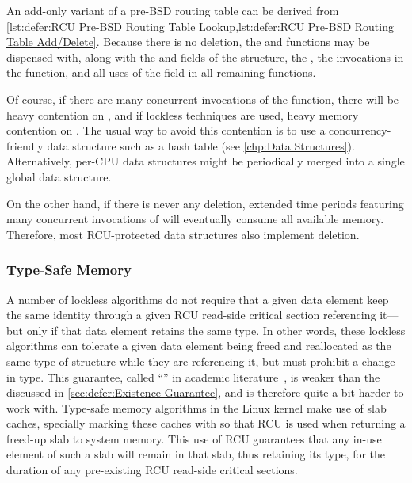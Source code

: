 An add-only variant of a pre-BSD routing table can be derived from
\cref{lst:defer:RCU Pre-BSD Routing Table Lookup,lst:defer:RCU Pre-BSD Routing Table Add/Delete}.
Because there is no deletion, the  and 
functions may be dispensed with, along with the 
and  fields of the  structure, the
, the  invocations in the
 function, and all uses of the  field
in all remaining functions.

Of course, if there are many concurrent invocations of the 
function, there will be heavy contention on , and if lockless
techniques are used, heavy memory contention on .
The usual way to avoid this contention is to use a concurrency-friendly
data structure such as a hash table (see \cref{chp:Data Structures}).
Alternatively, per-CPU data structures might be periodically merged
into a single global data structure.

On the other hand, if there is never any deletion, extended time periods
featuring many concurrent invocations of  will eventually
consume all available memory.
Therefore, most RCU-protected data structures also implement deletion.

\subsubsection{Type-Safe Memory}
\label{sec:defer:Type-Safe Memory}

A number of lockless algorithms do not require that a given data
element keep the same identity through a given RCU read-side critical
section referencing it---but only if that data element retains the
same type.
In other words, these lockless algorithms can tolerate a given data
element being freed and reallocated as the same type of structure
while they are referencing it, but must prohibit a change in type.
This guarantee, called ``'' in
academic literature~\cite{Cheriton96a},
is weaker than the  discussed
in \cref{sec:defer:Existence Guarantee},
and is therefore quite a bit harder to work with.
Type-safe memory algorithms in the Linux kernel make use of slab caches,
specially marking these caches with 
so that RCU is used when returning a freed-up
slab to system memory.
This use of RCU guarantees that any in-use element of
such a slab will remain in that slab, thus retaining its type,
for the duration of any pre-existing RCU read-side critical sections.

